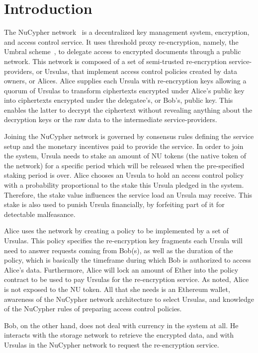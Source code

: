 \section{Introduction}
\label{intro}
The NuCypher network~\cite{nucypher,egorov2017nucypher} is a decentralized key management 
system, encryption, and access control service. It uses threshold proxy re-encryption, namely, the 
Umbral scheme~\cite{umbral2018}, to delegate access to encrypted 
documents through a public network. This network is composed of a set of semi-trusted 
re-encryption service-providers, or Ursulas, that implement access control policies created by data 
owners, or Alices. Alice supplies each Ursula with re-encryption keys allowing a quorum of Ursulas to transform 
ciphertexts encrypted under Alice's public key into ciphertexts encrypted under the delegatee's, or Bob's,
public key. This enables the latter to decrypt the ciphertext without revealing anything about the
decryption keys or the raw data to the intermediate service-providers. 


Joining the NuCypher network is governed by consensus rules defining the service setup
and the monetary incentives paid to provide the service. In order to join the 
system, Ursula needs to stake an amount of NU tokens (the native token of the network) for a specific period
which will be released when the pre-specified staking period is over. Alice chooses an
Ursula to hold an access control policy with a probability proportional to the stake this Ursula 
pledged in the system. Therefore, the stake value influences the service load an Ursula
may receive. This stake is also used to punish Ursula financially, by forfeiting part 
of it for detectable malfeasance. 


Alice uses the network by creating a policy to be implemented by a 
set of Ursulas. This policy specifies the re-encryption key fragments each Ursula will
need to answer requests coming from Bob(s), as well as the duration of the policy, which 
is basically the timeframe during which Bob is authorized to access Alice's data.  Furthermore,
Alice will lock an amount of Ether into the policy contract to be used to pay Ursulas for the re-encryption 
service. As noted, Alice is not exposed to the NU token. All that she needs is an Ethereum
wallet, awareness of the NuCypher network architecture to select Ursulas, and knowledge of the
NuCypher rules of preparing access control policies.


Bob, on the other hand, does not deal with currency in the system at all. He interacts with the storage 
network to retrieve the encrypted data, and with Ursulas in the NuCypher network to request the
re-encryption service.


